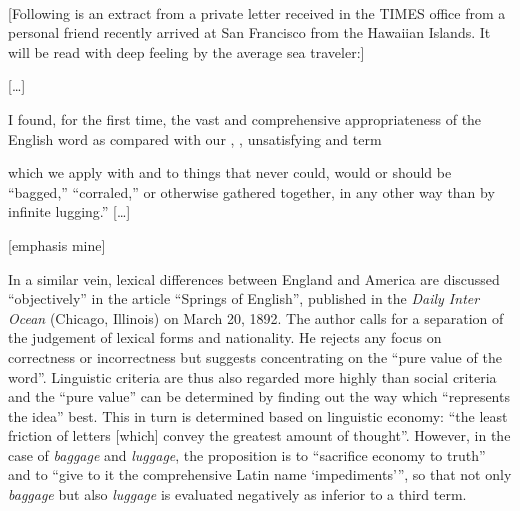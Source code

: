 \begin{ipquote}
\begin{center}
\\
\end{center}
{{[Following is an extract from a private letter received in the TIMES office from a personal friend recently arrived at San Francisco from the Hawaiian Islands. It will be read with deep feeling by the average sea traveler:]}

\centering
{[…]}

I found, for the first time, the vast and comprehensive appropriateness of the English word  as compared with our , , unsatisfying and  term } {which we apply with  and  to things that never could, would or should be “bagged,” “corraled,” or otherwise gathered together, in any other way than by infinite lugging.” {[…]}   

\raggedleft
{[emphasis mine]}\\
}
\end{ipquote}

In a similar vein, lexical differences between England and America are discussed “objectively” in the article “Springs of English”, published in the \emph{Daily Inter Ocean} (Chicago, Illinois) on March 20, 1892. The author calls for a separation of the judgement of lexical forms and nationality. He rejects any focus on correctness or incorrectness but suggests concentrating on the “pure value of the word”. Linguistic criteria are thus also regarded more highly than social criteria and the “pure value” can be determined by finding out the way which “represents the idea” best. This in turn is determined based on linguistic economy: “the least friction of letters [which] convey the greatest amount of thought”. However, in the case of \emph{baggage} and \emph{luggage}, the proposition is to “sacrifice economy to truth” and to “give to it the comprehensive Latin name ‘impediments’”, so that not only \emph{baggage} but also \emph{luggage} is evaluated negatively as inferior to a third term.


